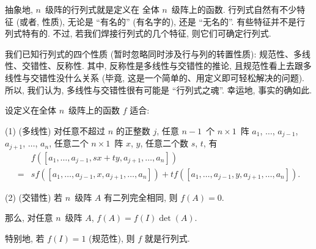 \documentclass[%
    UTF8,%
    fontset=none,%
    punct=kaiming,%
    zihao=-4,%
    a4paper,%
    oneside,%
]{ctexbook}
\begin{document}
抽象地, \(n\)~级阵的行列式就是定义在%
全体 \(n\)~级阵上的函数.
行列式自然有不少特征 (或者, 性质),
无论是 ``有名的'' (有名字的),
还是 ``无名的''.
有些特征并不是行列式特有的.
不过, 若我们焊接行列式的几个特征,
则它们可确定行列式.

我们已知行列式的四个性质
(暂时忽略同时涉及行与列的转置性质):
规范性、多线性、交错性、反称性.
其中, 反称性是多线性与交错性的推论,
且规范性看上去跟多线性与交错性没什么关系
(毕竟,
这是一个简单的、用定义即可轻松解决的问题).
所以, 我们认为,
多线性与交错性很有可能是 ``行列式之魂''.
幸运地, 事实的确如此.

\begin{theorem}
    设定义在全体 \(n\)~级阵上的函数 \(f\) 适合:

    (1)
    (多线性)
    对任意不超过 \(n\) 的正整数 \(j\),
    任意 \(n-1\)~个 \(n \times 1\)~阵
    \(a_1\), \(\dots\), \(a_{j-1}\),
    \(a_{j+1}\), \(\dots\), \(a_n\),
    任意二个 \(n \times 1\)~阵 \(x\), \(y\),
    任意二个数 \(s\), \(t\),
    有
    \begin{align*}
             & f
            {([a_1, \dots, a_{j-1}, sx + ty,
                        a_{j+1}, \dots, a_n])}
        \\
        = {} &
        s
        f {([a_1, \dots, a_{j-1}, x, a_{j+1}, \dots, a_n])}
        +
        t
        f {([a_1, \dots, a_{j-1}, y, a_{j+1}, \dots, a_n])}.
    \end{align*}

    (2)
    (交错性)
    若 \(n\)~级阵 \(A\) 有二列完全相同,
    则 \(f {(A)} = 0\).

    那么, 对任意 \(n\)~级阵 \(A\),
    \(f(A) = f(I) \det {(A)}\).

    特别地, 若 \(f(I) = 1\) (规范性),
    则 \(f\) 就是行列式.
\end{theorem}
\end{document}
